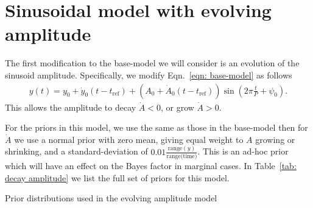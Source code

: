 \documentclass{article}
\newcommand{\tref}{t_{\textrm{ref}}}
\begin{document}
\section{Sinusoidal model with evolving amplitude}

The first modification to the base-model we will consider is an evolution of
the sinusoid amplitude.
Specifically, we modify Eqn.~\eqref{eqn: base-model} as follows
\begin{align}
y(t) = y_0 + \dot{y}_0(t - \tref) +
(A_0 + \dot{A}_0(t-\tref)) \sin\left(2\pi \frac{t}{P} + \psi_0\right).
\label{eqn: decay amplitude}
\end{align}
This allows the amplitude to decay $\dot{A} < 0$, or grow $\dot{A} > 0$.

For the priors in this model, we use the same as those in the base-model then
for $\dot{A}$ we use a normal prior with zero mean, giving equal weight to $A$
growing or shrinking, and a standard-deviation of
$0.01\frac{\textrm{range}(y)}{\textrm{range(time)}}$. This is an ad-hoc prior
which will have an effect on the Bayes factor in marginal cases. In Table~\ref{tab: decay amplitude} we list the full set of priors for this model.
\begin{table}[htb]
\centering
\caption{Prior distributions used in the evolving amplitude model}
\label{tab: decay amplitude}

\end{table}
\end{document}
